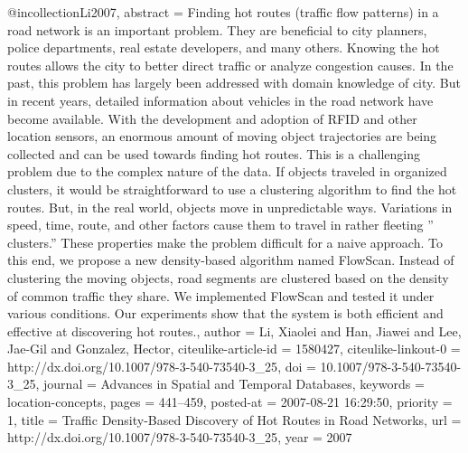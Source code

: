 @incollection{Li2007,
    abstract = {Finding hot routes (traffic flow patterns) in a road network is an important problem. They are beneficial to city planners, police departments, real estate developers, and many others. Knowing the hot routes allows the city to better direct traffic or analyze congestion causes. In the past, this problem has largely been addressed with domain knowledge of city. But in recent years, detailed information about vehicles in the road network have become available. With the development and adoption of RFID and other location sensors, an enormous amount of moving object trajectories are being collected and can be used towards finding hot routes. This is a challenging problem due to the complex nature of the data. If objects traveled in organized clusters, it would be straightforward to use a clustering algorithm to find the hot routes. But, in the real world, objects move in unpredictable ways. Variations in speed, time, route, and other factors cause them to travel in rather fleeting  ” clusters.” These properties make the problem difficult for a naive approach. To this end, we propose a new density-based algorithm named FlowScan. Instead of clustering the moving objects, road segments are clustered based on the density of common traffic they share. We implemented FlowScan and tested it under various conditions. Our experiments show that the system is both efficient and effective at discovering hot routes.},
    author = {Li, Xiaolei and Han, Jiawei and Lee, Jae-Gil and Gonzalez, Hector},
    citeulike-article-id = {1580427},
    citeulike-linkout-0 = {http://dx.doi.org/10.1007/978-3-540-73540-3\_25},
    doi = {10.1007/978-3-540-73540-3\_25},
    journal = {Advances in Spatial and Temporal Databases},
    keywords = {location-concepts},
    pages = {441--459},
    posted-at = {2007-08-21 16:29:50},
    priority = {1},
    title = {Traffic Density-Based Discovery of Hot Routes in Road Networks},
    url = {http://dx.doi.org/10.1007/978-3-540-73540-3\_25},
    year = {2007}
}
